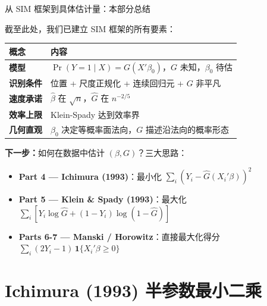 \documentclass[aspectratio=169, 10pt]{beamer}
\begin{document}
\begin{frame}{从 SIM 框架到具体估计量：本部分总结}

  截至此处，我们已建立 SIM 框架的所有要素：

  \begin{center}\footnotesize
  \begin{tabular}{p{4cm}|p{8cm}}
  \hline
  概念 & 内容 \\
  \hline
  \textbf{模型} & $\Pr(Y=1\mid X) = G(X'\beta_0)$，$G$ 未知，$\beta_0$ 待估 \\
  \hline
  \textbf{识别条件} & 位置 + 尺度正规化 + 连续回归元 + $G$ 非平凡 \\
  \hline
  \textbf{速度承诺} & $\hat\beta$ 在 $\sqrt{n}$，$\hat G$ 在 $n^{-2/5}$ \\
  \hline
  \textbf{效率上限} & Klein-Spady 达到效率界 \\
  \hline
  \textbf{几何直观} & $\beta_0$ 决定等概率面法向，$G$ 描述沿法向的概率形态 \\
  \hline
  \end{tabular}
  \end{center}

  \begin{keybox}
    \textbf{下一步：}如何在数据中估计 $(\beta, G)$？三大思路：
    \begin{itemize}\setlength{\itemsep}{1pt}
      \item \textbf{Part 4 — Ichimura (1993)}：最小化 $\sum_i (Y_i - \hat G(X_i'\beta))^2$
      \item \textbf{Part 5 — Klein \& Spady (1993)}：最大化 $\sum_i [Y_i \log \hat G + (1-Y_i)\log(1-\hat G)]$
      \item \textbf{Parts 6-7 — Manski / Horowitz}：直接最大化得分 $\sum_i (2Y_i - 1)\,\mathbf{1}\{X_i'\beta \geq 0\}$
    \end{itemize}
  \end{keybox}

\end{frame}

\section{Ichimura (1993) 半参数最小二乘}
\end{document}
